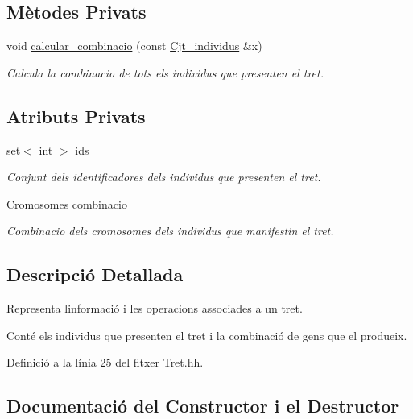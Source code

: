 \subsection*{Mètodes Privats}
\begin{DoxyCompactItemize}
\item 
void \hyperlink{class_tret_a0b2a7bd1d845412f4fc94d0625a9e782}{calcular\+\_\+combinacio} (const \hyperlink{class_cjt__individus}{Cjt\+\_\+individus} \&x)
\begin{DoxyCompactList}\small\item\em Calcula la combinacio de tots els individus que presenten el tret. \end{DoxyCompactList}\end{DoxyCompactItemize}
\subsection*{Atributs Privats}
\begin{DoxyCompactItemize}
\item 
set$<$ int $>$ \hyperlink{class_tret_a918c15168c43121f4d2c1737165b607c}{ids}
\begin{DoxyCompactList}\small\item\em Conjunt dels identificadores dels individus que presenten el tret. \end{DoxyCompactList}\item 
\hyperlink{class_cromosomes}{Cromosomes} \hyperlink{class_tret_aa3cd7d694d507642466ccba3fe92a077}{combinacio}
\begin{DoxyCompactList}\small\item\em Combinacio dels cromosomes dels individus que manifestin el tret. \end{DoxyCompactList}\end{DoxyCompactItemize}


\subsection{Descripció Detallada}
Representa l\textquotesingle{}informació i les operacions associades a un tret. 

Conté els individus que presenten el tret i la combinació de gens que el produeix. 

Definició a la línia 25 del fitxer Tret.\+hh.



\subsection{Documentació del Constructor i el Destructor}
